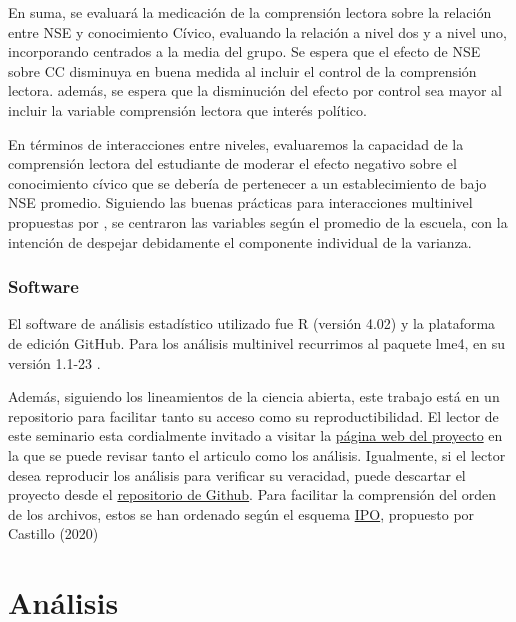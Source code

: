 \documentclass[12pt,twoside]{templates/facsothesis}
\begin{document}
En suma, se evaluará la medicación de la comprensión lectora sobre la relación entre NSE y conocimiento Cívico, evaluando la relación a nivel dos y a nivel uno, incorporando centrados a la media del grupo. Se espera que el efecto de NSE sobre CC disminuya en buena medida al incluir el control de la comprensión lectora. además, se espera que la disminución del efecto por control sea mayor al incluir la variable comprensión lectora que interés político.

En términos de interacciones entre niveles, evaluaremos la capacidad de la comprensión lectora del estudiante de moderar el efecto negativo sobre el conocimiento cívico que se debería de pertenecer a un establecimiento de bajo NSE promedio. Siguiendo las buenas prácticas para interacciones multinivel propuestas por \citep{aguinis_BestPractice_2013}, se centraron las variables según el promedio de la escuela, con la intención de despejar debidamente el componente individual de la varianza.

\hypertarget{software}{%
\subsection{Software}\label{software}}

El software de análisis estadístico utilizado fue R (versión 4.02) y la plataforma de edición GitHub. Para los análisis multinivel recurrimos al paquete lme4, en su versión 1.1-23 \citep{bates_Package_2020}.

Además, siguiendo los lineamientos de la ciencia abierta, este trabajo está en un repositorio para facilitar tanto su acceso como su reproductibilidad. El lector de este seminario esta cordialmente invitado a visitar la \href{https://franciscomeneses.github.io/Seminario/docs/index.html}{página web del proyecto} en la que se puede revisar tanto el articulo como los análisis. Igualmente, si el lector desea reproducir los análisis para verificar su veracidad, puede descartar el proyecto desde el \href{https://github.com/franciscomeneses/Seminario}{repositorio de Github}. Para facilitar la comprensión del orden de los archivos, estos se han ordenado según el esquema \href{https://juancarloscastillo.github.io/ipo/}{IPO}, propuesto por Castillo (2020)

\hypertarget{anuxe1lisis}{%
\chapter{Análisis}\label{anuxe1lisis}}
\end{document}
